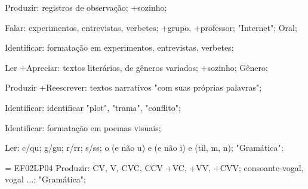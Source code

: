  Produzir: registros de observação; +sozinho; 

 Falar: experimentos, entrevistas, verbetes; +grupo, +professor; "Internet"; Oral;

 Identificar: formatação em experimentos, entrevistas, verbetes; 

 Ler +Apreciar: textos literários, de gêneros variados; +sozinho; Gênero; 

 Produzir +Reescrever: textos narrativos "com suas próprias palavras";

 Identificar: identificar "plot", "trama", "conflito"; 

 Identificar: formatação em poemas visuais;

 Ler: c/qu; g/gu; r/rr; s/ss; o (e não u) e (e não i) e (til, m, n); "Gramática";

 = EF02LP04 Produzir: CV, V, CVC, CCV +VC, +VV, +CVV; consoante-vogal, vogal ...; "Gramática";

